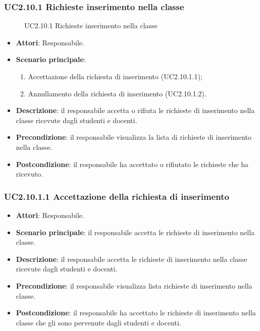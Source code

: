 \subsubsection{UC2.10.1 Richieste inserimento nella classe}
\begin{figure}[H]
\centering
\noindent{}
\caption{UC2.10.1 Richieste inserimento nella classe}
\end{figure}
\begin{itemize}
\item \textbf{Attori}: Responsabile.
\item \textbf{Scenario principale}:
\begin{enumerate}
\item Accettazione della richiesta di inserimento (UC2.10.1.1);
\item Annullamento della richiesta di inserimento (UC2.10.1.2).
\end{enumerate}
\item \textbf{Descrizione}: il responsabile accetta o rifiuta le richieste di inserimento nella classe ricevute dagli studenti e docenti.
\item \textbf{Precondizione}: il responsabile visualizza la lista di richieste di inserimento nella classe.
\item \textbf{Postcondizione}: il responsabile ha accettato o rifiutato le richieste che ha ricevuto.
\end{itemize}
\subsubsection{UC2.10.1.1 Accettazione della richiesta di inserimento}
\begin{itemize}
\item \textbf{Attori}: Responsabile.
\item \textbf{Scenario principale}: il responsabile accetta le richieste di inserimento nella classe.
\item \textbf{Descrizione}: il responsabile accetta le richieste di inserimento nella classe ricevute dagli studenti e docenti.
\item \textbf{Precondizione}: il responsabile visualizza lista richieste di inserimento nella classe.
\item \textbf{Postcondizione}: il responsabile ha accettato le richieste di inserimento nella classe che gli sono pervenute dagli studenti e docenti.
\end{itemize}
